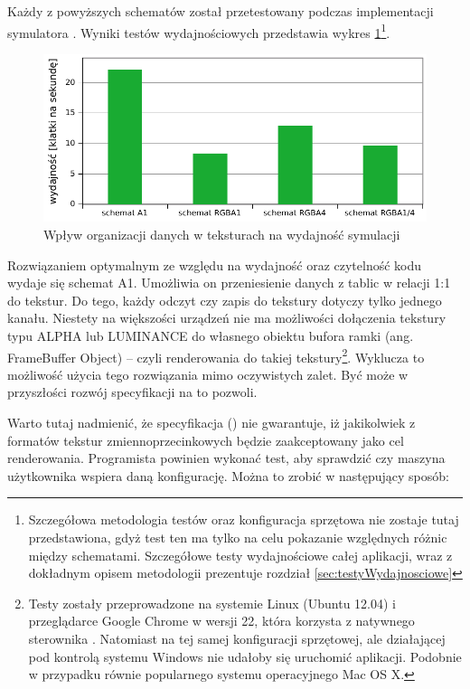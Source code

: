 Każdy z powyższych schematów został przetestowany podczas implementacji
symulatora . Wyniki testów wydajnościowych przedstawia wykres
\ref{fig:texPerf}\footnote{Szczegółowa metodologia testów oraz konfiguracja
sprzętowa nie zostaje tutaj przedstawiona, gdyż test ten ma tylko na celu
pokazanie względnych różnic między schematami. Szczegółowe testy
wydajnościowe całej aplikacji, wraz z dokładnym opisem metodologii prezentuje
rozdział \ref{sec:testyWydajnosciowe}}.

\begin{figure}[!h]
\centering
\includegraphics[width=.9\textwidth]{img/texPerf}
\caption{Wpływ organizacji danych w teksturach na wydajność symulacji 
}
\label{fig:texPerf}
\end{figure}

Rozwiązaniem optymalnym ze względu na wydajność oraz czytelność kodu wydaje się
schemat A1. Umożliwia on przeniesienie danych z tablic w relacji 1:1 do tekstur.
Do tego, każdy odczyt czy zapis do tekstury dotyczy tylko jednego kanału.
Niestety na większości urządzeń nie ma możliwości dołączenia tekstury typu
ALPHA lub LUMINANCE do własnego obiektu bufora ramki (ang. FrameBuffer Object)
-- czyli renderowania do takiej tekstury\footnote{Testy zostały przeprowadzone
na systemie Linux (Ubuntu 12.04) i przeglądarce Google Chrome w wersji 22, która
korzysta z natywnego sterownika . Natomiast na tej samej konfiguracji
sprzętowej, ale działającej pod kontrolą systemu Windows nie udałoby się
uruchomić aplikacji. Podobnie w przypadku równie popularnego systemu
operacyjnego Mac OS X.}. Wyklucza to możliwość użycia tego rozwiązania mimo
oczywistych zalet. Być może w przyszłości rozwój specyfikacji  na to
pozwoli.

Warto tutaj nadmienić, że specyfikacja  (\cite{WebGLSpec}) nie
gwarantuje, iż jakikolwiek z formatów tekstur zmiennoprzecinkowych będzie
zaakceptowany jako cel renderowania. Programista powinien wykonać test, aby
sprawdzić czy maszyna użytkownika wspiera daną konfigurację. Można to zrobić w
następujący sposób:

